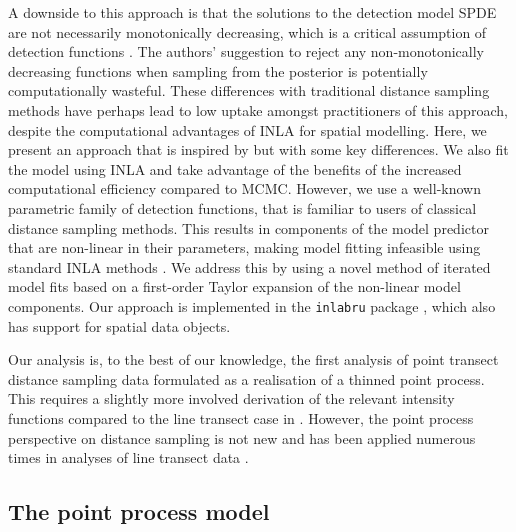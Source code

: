 \documentclass{statsoc}
\begin{document}
A downside to this approach is that the solutions to the detection model SPDE are not necessarily monotonically decreasing, which is a critical assumption of detection functions \citep{buckland_distance_2015}. The authors' suggestion to reject any non-monotonically decreasing functions when sampling from the posterior is potentially computationally wasteful. These differences with traditional distance sampling methods have perhaps lead to low uptake amongst practitioners of this approach, despite the computational advantages of INLA for spatial modelling. Here, we present an approach that is inspired by \citet{yuan_point_2017} but with some key differences. We also fit the model using INLA and take advantage of the benefits of the increased computational efficiency compared to MCMC.  However, we use a well-known parametric family of detection functions, that is familiar to users of classical distance sampling methods. This results in components of the model predictor that are non-linear in their parameters, making model fitting infeasible using standard INLA methods \citep{rue_approximate_2009}.  We address this by using a novel method of iterated model fits based on a first-order Taylor expansion of the non-linear model components.  Our approach is implemented in the \texttt{inlabru} package \citep{lindgren_inlabru_2024, bachl_inlabru_2019}, which also has support for spatial data objects.

Our analysis is, to the best of our knowledge, the first analysis of point transect distance sampling data formulated as a realisation of a thinned point process.  This requires a slightly more involved derivation of the relevant intensity functions compared to the line transect case in \cite{yuan_point_2017}. However, the point process perspective on distance sampling is not new and has been applied numerous times in analyses of line transect data \citep{buckland_model-based_2016, niemi_bayesian_2010, johnson_model-based_2010, waagepetersen_likelihood-based_2006, hedley_spatial_2004,  hogmander_random_1991, stoyan_remark_1982}.

\subsection{The point process model}
\end{document}

